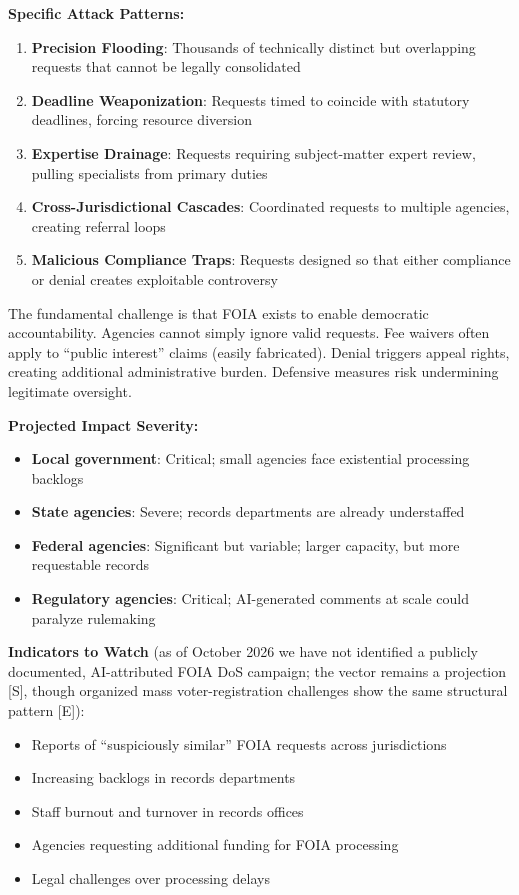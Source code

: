\documentclass[11pt,letterpaper]{article}
\begin{document}
\textbf{Specific Attack Patterns:}
\begin{enumerate}
  \item \textbf{Precision Flooding}: Thousands of technically distinct but overlapping requests that cannot be legally consolidated
  \item \textbf{Deadline Weaponization}: Requests timed to coincide with statutory deadlines, forcing resource diversion
  \item \textbf{Expertise Drainage}: Requests requiring subject-matter expert review, pulling specialists from primary duties
  \item \textbf{Cross-Jurisdictional Cascades}: Coordinated requests to multiple agencies, creating referral loops
  \item \textbf{Malicious Compliance Traps}: Requests designed so that either compliance or denial creates exploitable controversy
\end{enumerate}

\begin{warnbox}
The fundamental challenge is that FOIA exists to enable democratic accountability. Agencies cannot simply ignore valid requests. Fee waivers often apply to ``public interest'' claims (easily fabricated). Denial triggers appeal rights, creating additional administrative burden. Defensive measures risk undermining legitimate oversight.
\end{warnbox}

\textbf{Projected Impact Severity:}
\begin{itemize}
  \item \textbf{Local government}: Critical; small agencies face existential processing backlogs
  \item \textbf{State agencies}: Severe; records departments are already understaffed
  \item \textbf{Federal agencies}: Significant but variable; larger capacity, but more requestable records
  \item \textbf{Regulatory agencies}: Critical; AI-generated comments at scale could paralyze rulemaking
\end{itemize}

\textbf{Indicators to Watch} (as of October 2026 we have not identified a publicly documented, AI-attributed FOIA DoS campaign; the vector remains a projection [S], though organized mass voter-registration challenges show the same structural pattern [E]):
\begin{itemize}
  \item Reports of ``suspiciously similar'' FOIA requests across jurisdictions
  \item Increasing backlogs in records departments
  \item Staff burnout and turnover in records offices
  \item Agencies requesting additional funding for FOIA processing
  \item Legal challenges over processing delays
\end{itemize}
\end{document}
